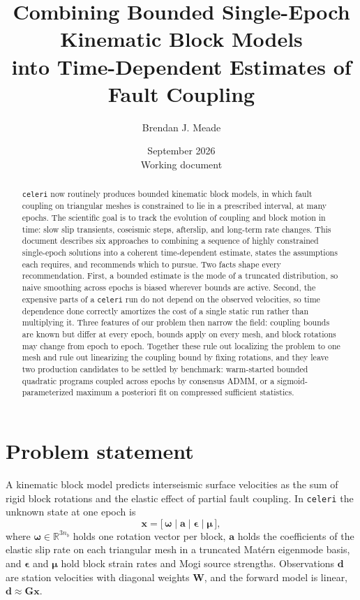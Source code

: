 \documentclass[11pt]{article}
\title{Combining Bounded Single-Epoch Kinematic Block Models\\into Time-Dependent Estimates of Fault Coupling}
\author{Brendan J. Meade}
\date{September 2026 \\[2pt] \small Working document}
\newcommand{\vect}[1]{\bm{#1}}
\newcommand{\mat}[1]{\mathbf{#1}}
\newcommand{\code}[1]{\texttt{#1}}
\begin{document}
\maketitle

\begin{abstract}
\noindent
\code{celeri} now routinely produces bounded kinematic block models, in which fault coupling on triangular meshes is constrained to lie in a prescribed interval, at many epochs. The scientific goal is to track the evolution of coupling and block motion in time: slow slip transients, coseismic steps, afterslip, and long-term rate changes. This document describes six approaches to combining a sequence of highly constrained single-epoch solutions into a coherent time-dependent estimate, states the assumptions each requires, and recommends which to pursue. Two facts shape every recommendation. First, a bounded estimate is the mode of a truncated distribution, so naive smoothing across epochs is biased wherever bounds are active. Second, the expensive parts of a \code{celeri} run do not depend on the observed velocities, so time dependence done correctly amortizes the cost of a single static run rather than multiplying it. Three features of our problem then narrow the field: coupling bounds are known but differ at every epoch, bounds apply on every mesh, and block rotations may change from epoch to epoch. Together these rule out localizing the problem to one mesh and rule out linearizing the coupling bound by fixing rotations, and they leave two production candidates to be settled by benchmark: warm-started bounded quadratic programs coupled across epochs by consensus ADMM, or a sigmoid-parameterized maximum a posteriori fit on compressed sufficient statistics.
\end{abstract}

\section{Problem statement}

A kinematic block model predicts interseismic surface velocities as the sum of rigid block rotations and the elastic effect of partial fault coupling. In \code{celeri} the unknown state at one epoch is
\begin{equation}
\vect{x} = \bigl[\, \vect{\omega} \;\big|\; \vect{a} \;\big|\; \vect{\epsilon} \;\big|\; \vect{\mu} \,\bigr],
\end{equation}
where $\vect{\omega} \in \mathbb{R}^{3 n_b}$ holds one rotation vector per block, $\vect{a}$ holds the coefficients of the elastic slip rate on each triangular mesh in a truncated Mat\'ern eigenmode basis, and $\vect{\epsilon}$ and $\vect{\mu}$ hold block strain rates and Mogi source strengths. Observations $\vect{d}$ are station velocities with diagonal weights $\mat{W}$, and the forward model is linear, $\vect{d} \approx \mat{G}\vect{x}$.
\end{document}
